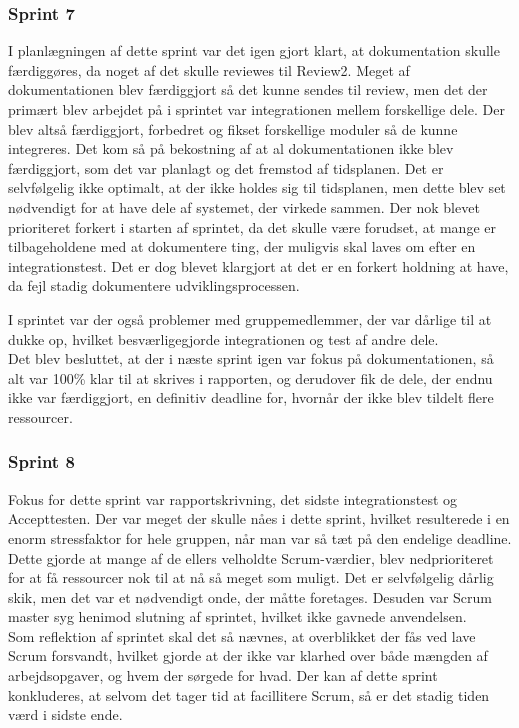 \documentclass[a4paper,12pt,fleqn,oneside]{article}
\begin{document}
\subsubsection{Sprint 7}
I planlægningen af dette sprint var det igen gjort klart, at dokumentation skulle færdiggøres, da noget af det skulle reviewes til Review2. Meget af dokumentationen blev færdiggjort så det kunne sendes til review, men det der primært blev arbejdet på i sprintet var integrationen mellem forskellige dele. Der blev altså færdiggjort, forbedret og fikset forskellige moduler så de kunne integreres. Det kom så på bekostning af at al dokumentationen ikke blev færdiggjort, som det var planlagt og det fremstod af tidsplanen. Det er selvfølgelig ikke optimalt, at der ikke holdes sig til tidsplanen, men dette blev set nødvendigt for at have dele af systemet, der virkede sammen. Der nok blevet prioriteret forkert i starten af sprintet, da det skulle være forudset, at mange er tilbageholdene med at dokumentere ting, der muligvis skal laves om efter en integrationstest. Det er dog blevet klargjort at det er en forkert holdning at have, da fejl stadig dokumentere udviklingsprocessen.

I sprintet var der også problemer med gruppemedlemmer, der var dårlige til at dukke op, hvilket besværligegjorde integrationen og test af andre dele. \\

Det blev besluttet, at der i næste sprint igen var fokus på dokumentationen, så alt var 100\% klar til at skrives i rapporten, og derudover fik de dele, der endnu ikke var færdiggjort, en definitiv deadline for, hvornår der ikke blev tildelt flere ressourcer.
\subsubsection{Sprint 8}
Fokus for dette sprint var rapportskrivning, det sidste integrationstest og Accepttesten. Der var meget der skulle nåes i dette sprint, hvilket resulterede i en enorm stressfaktor for hele gruppen, når man var så tæt på den endelige deadline. Dette gjorde at mange af de ellers velholdte Scrum-værdier, blev nedprioriteret for at få ressourcer nok til at nå så meget som muligt. Det er selvfølgelig dårlig skik, men det var et nødvendigt onde, der måtte foretages. Desuden var Scrum master syg henimod slutning af sprintet, hvilket ikke gavnede anvendelsen.\\
Som reflektion af sprintet skal det så nævnes, at overblikket der fås ved lave Scrum forsvandt, hvilket gjorde at der ikke var klarhed over både mængden af arbejdsopgaver, og hvem der sørgede for hvad. Der kan af dette sprint konkluderes, at selvom det tager tid at facillitere Scrum, så er det stadig tiden værd i sidste ende.   
\end{document}
